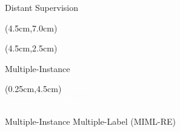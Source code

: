 \def\title{MIML Relation Extraction (MIML-RE)}
\begin{frame}{Distant Supervision}
\begin{center}
  \dsPlate
  \hspace{0.5cm}
  \dsPlate
  \hspace{0.5cm}
  \dsPlate
\end{center}
\pause
\begin{textblock*}{6cm}(4.5cm,7.0cm)
  \textcolor<1-1>{white}{$\uparrow$ }
\end{textblock*}
\begin{textblock*}{6cm}(4.5cm,2.5cm)
  \textcolor<1-1>{white}{$\downarrow$ }
\end{textblock*}
\end{frame}

\begin{frame}{Multiple-Instance}
\begin{center}
  \miPlate
\end{center}
\pause
\begin{textblock*}{4cm}(0.25cm,4.5cm)
  \textcolor<1-1>{white}{\textit{Latent} \\ per-mention relation $\rightarrow$}
\end{textblock*}
\end{frame}

\begin{frame}[noframenumbering]{Multiple-Instance Multiple-Label (MIML-RE)}
\begin{center}
  \mimlPlate
\end{center}
\end{frame}
